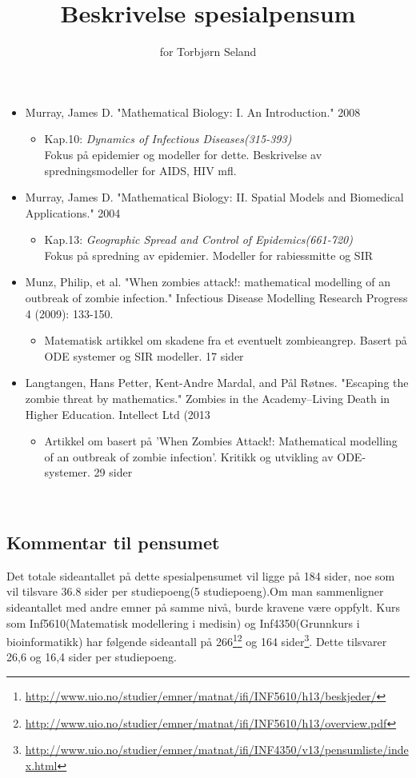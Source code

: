 \documentclass[norsk,11pt.a4paper]{article}
\begin{document}
\title{Beskrivelse spesialpensum}
\author{for Torbjørn Seland}
\maketitle

\begin{itemize}
	\item Murray, James D. "Mathematical Biology: I. An Introduction." 2008
	\begin{itemize}
		\item Kap.10: \emph{Dynamics of Infectious Diseases(315-393)}\\
		Fokus på epidemier og modeller for dette. Beskrivelse av spredningsmodeller 
		for AIDS, HIV mfl.
	\end{itemize}
	\item Murray, James D. "Mathematical Biology: II. Spatial Models and Biomedical Applications." 2004
	\begin{itemize}
		\item Kap.13: \emph{Geographic Spread and Control of Epidemics(661-720)}\\
		Fokus på spredning av epidemier. Modeller for rabiessmitte og SIR
	\end{itemize}
    \item Munz, Philip, et al. "When zombies attack!: mathematical modelling of an outbreak of zombie infection." Infectious Disease Modelling Research Progress 4 (2009): 133-150.
    \begin{itemize}
        \item Matematisk artikkel om skadene fra et eventuelt zombieangrep. Basert på ODE systemer og SIR modeller. 17 sider 
    \end{itemize}
    \item Langtangen, Hans Petter, Kent-Andre Mardal, and Pål Røtnes. "Escaping the zombie threat by mathematics." Zombies in the Academy–Living Death in Higher Education. Intellect Ltd (2013
    \begin{itemize}
        \item Artikkel om basert på 'When Zombies Attack!: Mathematical modelling of an outbreak of zombie infection'. Kritikk og utvikling av ODE-systemer. 29 sider
    \end{itemize}
\end{itemize}
\
\subsection*{Kommentar til pensumet}
Det totale sideantallet på dette spesialpensumet vil ligge på 184 sider, noe som vil tilsvare 36.8 sider per studiepoeng(5 studiepoeng).Om man sammenligner sideantallet med andre emner på samme nivå, burde kravene være oppfylt. Kurs som Inf5610(Matematisk modellering i medisin) og Inf4350(Grunnkurs i bioinformatikk) har følgende sideantall på 266\footnote{\url{http://www.uio.no/studier/emner/matnat/ifi/INF5610/h13/beskjeder/}}\footnote{\url{http://www.uio.no/studier/emner/matnat/ifi/INF5610/h13/overview.pdf}} og 164 sider\footnote{\url{http://www.uio.no/studier/emner/matnat/ifi/INF4350/v13/pensumliste/index.html}}. Dette tilsvarer 26,6 og 16,4 sider per studiepoeng.   
\end{document}
